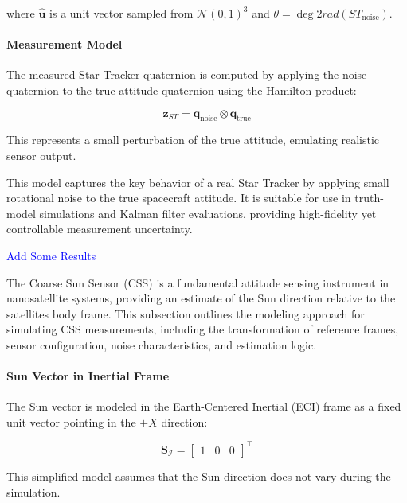 where $\hat{\mathbf{u}}$ is a unit vector sampled from $\mathcal{N}{(0,1)}^3$ and $\theta = \deg2rad(ST_{\text{noise}})$.

\paragraph{Measurement Model}

The measured Star Tracker quaternion is computed by applying the noise quaternion to the true attitude quaternion using the Hamilton product:

\begin{equation}
    \mathbf{z}_{ST} = \mathbf{q}_{\text{noise}} \otimes \mathbf{q}_{\text{true}}
\end{equation}

This represents a small perturbation of the true attitude, emulating realistic sensor output.

This model captures the key behavior of a real Star Tracker by applying small rotational noise to the true spacecraft attitude. 
It is suitable for use in truth-model simulations and Kalman filter evaluations, providing high-fidelity yet controllable measurement uncertainty.


\textcolor{blue}{Add Some Results}


\label{sec:css}

The Coarse Sun Sensor (CSS) is a fundamental attitude sensing instrument in nanosatellite systems, providing an estimate of the Sun direction relative to the satellites body frame. This subsection outlines the modeling approach for simulating CSS measurements, including the transformation of reference frames, sensor configuration, noise characteristics, and estimation logic.

\paragraph{Sun Vector in Inertial Frame}

The Sun vector is modeled in the Earth-Centered Inertial (ECI) frame as a fixed unit vector pointing in the $+X$ direction:

\begin{equation}
    \mathbf{S}_\mathcal{I} = \begin{bmatrix} 1 & 0 & 0 \end{bmatrix}^\top
\end{equation}

This simplified model assumes that the Sun direction does not vary during the simulation.

